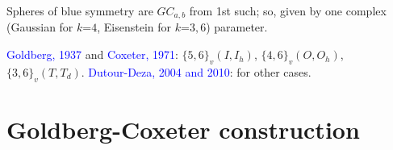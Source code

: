 \documentclass{beamer}
\begin{document}
\begin{frame}
\pause

Spheres of blue symmetry  are  $GC_{a,b}$ from 1st such; so, given
 by one complex (Gaussian for $k$=$4$, Eisenstein for $k$=$3,6$) 
parameter.


\textcolor{blue}{Goldberg, 1937} and \textcolor{blue}{Coxeter, 1971}: 
$\{5,6\}_v(I,I_h)$, $\{4,6\}_v(O,O_h)$,  
$\{3,6\}_v(T,T_d)$. 
\textcolor{blue}{Dutour-Deza, 2004 and  2010}: for other cases.
\end{frame}

\section[]{Goldberg-Coxeter construction}

\end{document}
